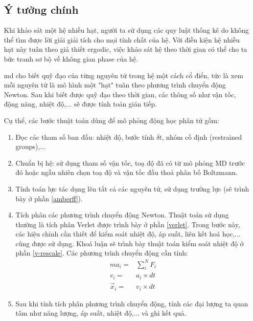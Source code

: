 \documentclass[12pt,a4paper,reqno, oneside]{book}
\begin{document}
	\subsection{Ý tưởng chính}
	
	Khi khảo sát một hệ nhiều hạt, người ta sử dụng các quy luật thống kê do không thể tìm được lời giải giải tích cho mọi tính chất của hệ. Với điều kiện hệ nhiều hạt này tuân theo giả thiết ergodic, việc khảo sát hệ theo thời gian có thể cho ta bức tranh sơ bộ về không gian phase của hệ.
	
	\Gls{md} cho biết quỹ đạo của từng nguyên tử trong hệ một cách cổ điển, tức là xem mỗi nguyên tử là mô hình một "hạt" tuân theo phương trình chuyển động Newton. Sau khi biết được quỹ đạo theo thời gian, các thông số như vận tốc, động năng, nhiệt độ,... sẽ được tính toán gián tiếp.
	
	Cụ thể, các bước thuật toán dùng để mô phỏng động học phân tử gồm:
	\begin{enumerate}
	\item Đọc các tham số ban đầu: nhiệt độ, bước tính $\delta t$, nhóm cố định (restrained groups),...
	\item Chuẩn bị hệ: sử dụng tham số vận tốc, toạ độ đã có từ mô phỏng MD trước đó hoặc ngẫu nhiên chọn toạ độ và vận tốc đầu thoả phân bố Boltzmann.
	\item Tính toán lực tác dụng lên tất cả các nguyên tử, sử dụng trường lực (sẽ trình bày ở phần \ref{amberff}).
	\item Tích phân các phương trình chuyển động Newton. Thuật toán sử dụng thường là tích phân Verlet được trình bày ở phần \ref{verlet}. Trong bước này, các hiệu chỉnh cần thiết để kiểm soát nhiệt độ, áp suất, liên kết hoá học,... cũng được sử dụng. Khoá luận sẽ trình bày thuật toán kiểm soát nhiệt độ ở phần \ref{v-rescale}. Các phương trình chuyển động cần tính:
	\begin{align}
	m a_{i} = & \sum_{i}^{N} F_{i} \\
	v_{i} = & a_{i}\times dt \\
	\label{velocity}
	\vec{x}_{i} = & v_{i}\times dt
	\end{align}
	\item Sau khi tính tích phân phương trình chuyển động, tính các đại lượng ta quan tâm như năng lượng, áp suất, nhiệt độ,... và ghi kết quả.
	\end{enumerate}
	
\end{document}

